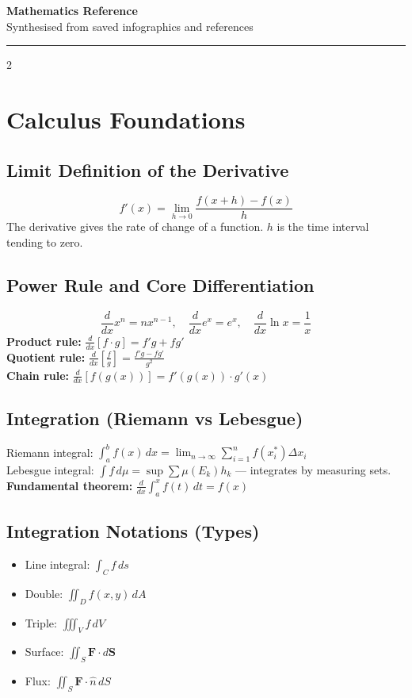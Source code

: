 \documentclass[10pt,a4paper]{article}
\begin{document}
\begin{center}
{\LARGE\bfseries\color{accent} Mathematics Reference}\\[4pt]
{\small Synthesised from saved infographics and references}
\end{center}
\vspace{4pt}
\hrule
\vspace{6pt}

\begin{multicols}{2}

\section{Calculus Foundations}

\subsection{Limit Definition of the Derivative}
\[
f'(x) = \lim_{h \to 0} \frac{f(x+h) - f(x)}{h}
\]
The derivative gives the rate of change of a function. $h$ is the time interval tending to zero.

\subsection{Power Rule and Core Differentiation}
\[
\frac{d}{dx} x^n = nx^{n-1}, \quad \frac{d}{dx} e^x = e^x, \quad \frac{d}{dx} \ln x = \frac{1}{x}
\]
\textbf{Product rule:} $\frac{d}{dx}[f \cdot g] = f'g + fg'$\\
\textbf{Quotient rule:} $\frac{d}{dx}\!\left[\frac{f}{g}\right] = \frac{f'g - fg'}{g^2}$\\
\textbf{Chain rule:} $\frac{d}{dx}[f(g(x))] = f'(g(x)) \cdot g'(x)$

\subsection{Integration (Riemann vs Lebesgue)}
Riemann integral: $\int_a^b f(x)\,dx = \lim_{n\to\infty}\sum_{i=1}^n f(x_i^*)\Delta x_i$\\
Lebesgue integral: $\int f\,d\mu = \sup \sum \mu(E_k) h_k$ — integrates by measuring sets.\\
\textbf{Fundamental theorem:} $\frac{d}{dx}\int_a^x f(t)\,dt = f(x)$

\subsection{Integration Notations (Types)}
\begin{itemize}
\item Line integral: $\int_C f\,ds$
\item Double: $\iint_D f(x,y)\,dA$
\item Triple: $\iiint_V f\,dV$
\item Surface: $\iint_S \mathbf{F}\cdot d\mathbf{S}$
\item Flux: $\iint_S \mathbf{F}\cdot\hat{n}\,dS$
\end{itemize}


\end{multicols}
\end{document}
